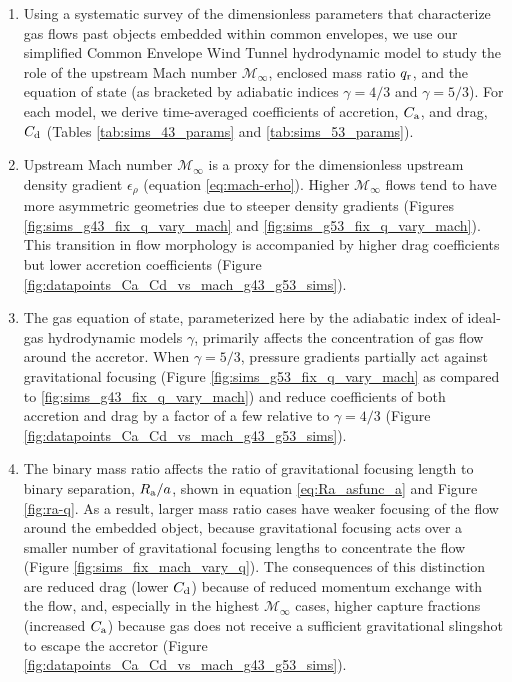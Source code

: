 \begin{enumerate}
\setlength\itemsep{1em}
\item Using a systematic survey of the dimensionless parameters that characterize gas flows past objects embedded within common envelopes, we use our simplified Common Envelope Wind Tunnel hydrodynamic model to study the role of the upstream Mach number $\mathcal{M}_\infty$, enclosed mass ratio $q_{\rm r}$, and the equation of state (as bracketed by adiabatic indices $\gamma=4/3$ and $\gamma=5/3$). For each model, we derive time-averaged coefficients of accretion, $C_{\rm a}$, and drag, $C_{\rm d}$ (Tables \ref{tab:sims_43_params} and \ref{tab:sims_53_params}).

\item Upstream Mach number $\mathcal{M}_\infty$ is a proxy for the dimensionless upstream density gradient $\epsilon_\rho$ (equation \ref{eq:mach-erho}). Higher $\mathcal{M}_\infty$ flows tend to have more asymmetric geometries due to steeper density gradients (Figures \ref{fig:sims_g43_fix_q_vary_mach} and \ref{fig:sims_g53_fix_q_vary_mach}). This transition in flow morphology is accompanied by higher drag coefficients but lower accretion coefficients (Figure \ref{fig:datapoints_Ca_Cd_vs_mach_g43_g53_sims}). 

\item The gas equation of state, parameterized here by the adiabatic index of ideal-gas hydrodynamic models $\gamma$, primarily affects the concentration of gas flow around the accretor. When $\gamma = 5/3$, pressure gradients partially act against gravitational focusing (Figure \ref{fig:sims_g53_fix_q_vary_mach} as compared to \ref{fig:sims_g43_fix_q_vary_mach}) and reduce coefficients of both accretion and drag by a factor of a few relative to $\gamma=4/3$ (Figure \ref{fig:datapoints_Ca_Cd_vs_mach_g43_g53_sims}). 

\item The binary mass ratio affects the ratio of gravitational focusing length to binary separation, $R_{\rm a}/a$, shown in equation \eqref{eq:Ra_asfunc_a} and Figure \ref{fig:ra-q}. As a result, larger mass ratio cases have weaker focusing of the flow around the embedded object, because gravitational focusing acts over a smaller number of gravitational focusing lengths to concentrate the flow (Figure \ref{fig:sims_fix_mach_vary_q}). The consequences of this distinction are reduced drag (lower $C_{\rm d}$) because of reduced momentum exchange with the flow, and, especially in the highest $\mathcal{M}_\infty$ cases, higher capture fractions (increased $C_{\rm a}$) because gas does not receive a sufficient gravitational slingshot to escape the accretor (Figure \ref{fig:datapoints_Ca_Cd_vs_mach_g43_g53_sims}).


\end{enumerate}
